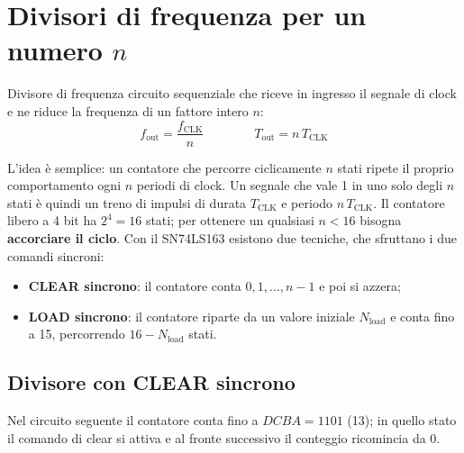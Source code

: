 \section{Divisori di frequenza per un numero $n$}

\begin{definizione}{Divisore di frequenza}
circuito sequenziale che riceve in ingresso il segnale di clock e ne riduce la frequenza di
un fattore intero $n$:
\[
f_{\text{out}} = \frac{f_{\text{CLK}}}{n} \qquad\qquad T_{\text{out}} = n\,T_{\text{CLK}}
\]
\end{definizione}

\noindent L'idea è semplice: un contatore che percorre ciclicamente $n$ stati ripete il
proprio comportamento ogni $n$ periodi di clock. Un segnale che vale 1 in uno solo degli
$n$ stati è quindi un treno di impulsi di durata $T_{\text{CLK}}$ e periodo
$n\,T_{\text{CLK}}$. Il contatore libero a 4 bit ha $2^4=16$ stati; per ottenere un
qualsiasi $n<16$ bisogna \textbf{accorciare il ciclo}. Con il SN74LS163 esistono due
tecniche, che sfruttano i due comandi sincroni:
\begin{itemize}[leftmargin=1.5em, itemsep=1pt]
    \item \textbf{CLEAR sincrono}: il contatore conta $0, 1, \ldots, n-1$ e poi si azzera;
    \item \textbf{LOAD sincrono}: il contatore riparte da un valore iniziale
          $N_{\text{load}}$ e conta fino a 15, percorrendo $16-N_{\text{load}}$ stati.
\end{itemize}

\subsection{Divisore con CLEAR sincrono}

Nel circuito seguente il contatore conta fino a $DCBA=1101$ (13); in quello stato il
comando di clear si attiva e al fronte successivo il conteggio ricomincia da 0.

